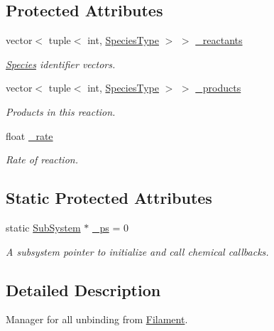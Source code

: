 \subsection*{Protected Attributes}
\begin{DoxyCompactItemize}
\item 
vector$<$ tuple$<$ int, \hyperlink{Species_8h_a50651af47c56ea0e27235468d23542cf}{Species\+Type} $>$ $>$ \hyperlink{classInternalFilamentRxnManager_a63de9061c3da4ad03cf4c530d2774979}{\+\_\+reactants}
\begin{DoxyCompactList}\small\item\em \hyperlink{classSpecies}{Species} identifier vectors. \end{DoxyCompactList}\item 
vector$<$ tuple$<$ int, \hyperlink{Species_8h_a50651af47c56ea0e27235468d23542cf}{Species\+Type} $>$ $>$ \hyperlink{classInternalFilamentRxnManager_afd213da1a3706e2e88962e5da886a5dc}{\+\_\+products}
\begin{DoxyCompactList}\small\item\em Products in this reaction. \end{DoxyCompactList}\item 
float \hyperlink{classInternalFilamentRxnManager_a8b98dd9e6f5d016149f5434b891806df}{\+\_\+rate}
\begin{DoxyCompactList}\small\item\em Rate of reaction. \end{DoxyCompactList}\end{DoxyCompactItemize}
\subsection*{Static Protected Attributes}
\begin{DoxyCompactItemize}
\item 
static \hyperlink{classSubSystem}{Sub\+System} $\ast$ \hyperlink{classInternalFilamentRxnManager_a973ce9cc2aae811e6867afa46193c5f2}{\+\_\+ps} = 0
\begin{DoxyCompactList}\small\item\em A subsystem pointer to initialize and call chemical callbacks. \end{DoxyCompactList}\end{DoxyCompactItemize}


\subsection{Detailed Description}
Manager for all unbinding from \hyperlink{classFilament}{Filament}. 

